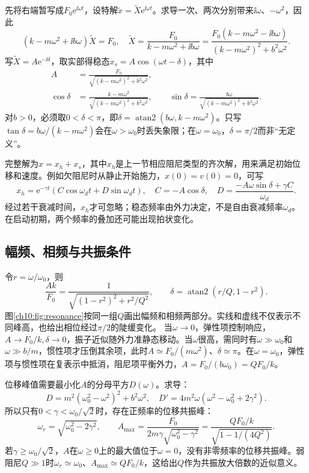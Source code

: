 先将右端暂写成$F_0\mathrm e^{\ii\omega t}$，设特解$\widetilde x=\widetilde X\mathrm e^{\ii\omega t}$。求导一次、两次分别带来$\ii\omega$、$-\omega^2$，因此
\[
 (k-m\omega^2+\ii b\omega)\widetilde X=F_0,
 \quad\widetilde X=\frac{F_0}{k-m\omega^2+\ii b\omega}
 =\frac{F_0(k-m\omega^2-\ii b\omega)}{(k-m\omega^2)^2+b^2\omega^2}.
\]
写$\widetilde X=A\mathrm e^{-\ii\delta}$，取实部得稳态$x_s=A\cos(\omega t-\delta)$，其中
\begin{align}
 A&=\frac{F_0}{\sqrt{(k-m\omega^2)^2+b^2\omega^2}},\label{ch10:eq:response-A}\\
 \cos\delta&=\frac{k-m\omega^2}{\sqrt{(k-m\omega^2)^2+b^2\omega^2}},\qquad
 \sin\delta=\frac{b\omega}{\sqrt{(k-m\omega^2)^2+b^2\omega^2}}.\label{ch10:eq:response-phase}
\end{align}
对$b>0$，必须取$0<\delta<\pi$，即$\delta=\operatorname{atan2}(b\omega,k-m\omega^2)$。只写$\tan\delta=b\omega/(k-m\omega^2)$会在$\omega>\omega_0$时丢失象限；在$\omega=\omega_0$，$\delta=\pi/2$而非“无定义”。

完整解为$x=x_h+x_s$，其中$x_h$是上一节相应阻尼类型的齐次解，用来满足初始位移和速度。例如欠阻尼时从静止开始施力，$x(0)=v(0)=0$，可写
\[
 x_h=\mathrm e^{-\gamma t}(C\cos\omega_dt+D\sin\omega_dt),\quad
 C=-A\cos\delta,\quad
 D=\frac{-A\omega\sin\delta+\gamma C}{\omega_d}.
\]
经过若干衰减时间，$x_h$才可忽略；稳态频率由外力决定，不是自由衰减频率$\omega_d$。在启动初期，两个频率的叠加还可能出现拍状变化。

\subsection{幅频、相频与共振条件}
令$r=\omega/\omega_0$，则
\[
 \frac{Ak}{F_0}=\frac1{\sqrt{(1-r^2)^2+r^2/Q^2}},\qquad
 \delta=\operatorname{atan2}(r/Q,1-r^2).
\]
图\ref{ch10:fig:resonance}按同一组$Q$画出幅频和相频两部分。实线和虚线不仅表示不同峰高，也给出相位经过$\pi/2$的陡缓变化。
\chTenResonanceFigure
当$\omega\to0$，弹性项控制响应，$A\to F_0/k,\delta\to0$，振子近似随外力准静态移动。当$\omega$很高，需同时有$\omega\gg\omega_0$和$\omega\gg b/m$，惯性项才压倒其余项，此时$A\simeq F_0/(m\omega^2)$、$\delta\simeq\pi$。在$\omega=\omega_0$，弹性项与惯性项在复表示中抵消，阻尼项平衡外力，$A=F_0/(b\omega_0)=QF_0/k$。

位移峰值需要最小化$A$的分母平方$D(\omega)$。求导：
\[
 D=m^2(\omega_0^2-\omega^2)^2+b^2\omega^2,
 \quad D'=4m^2\omega(\omega^2-\omega_0^2+2\gamma^2).
\]
所以只有$0<\gamma<\omega_0/\sqrt2$时，存在正频率的位移共振峰：
\[
 \omega_r=\sqrt{\omega_0^2-2\gamma^2},\qquad
 A_{\max}=\frac{F_0}{2m\gamma\sqrt{\omega_0^2-\gamma^2}}
 =\frac{QF_0/k}{\sqrt{1-1/(4Q^2)}}.
\]
若$\gamma\geq\omega_0/\sqrt2$，$A$在$\omega\geq0$上的最大值位于$\omega=0$，没有非零频率的位移共振峰。弱阻尼$Q\gg1$时$\omega_r\simeq\omega_0$、$A_{\max}\simeq QF_0/k$，这给出$Q$作为共振放大倍数的近似意义。

